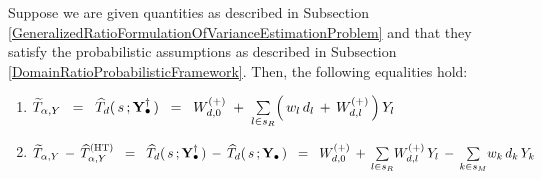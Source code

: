 \vskip 0.1cm
\begin{lemma}
\label{DomainRatioNumeratorImputationError}
\mbox{}
\vskip 0.1cm
\noindent
Suppose we are given quantities as described in Subsection
\ref{GeneralizedRatioFormulationOfVarianceEstimationProblem}
and
that they satisfy the probabilistic assumptions as described in Subsection
\ref{DomainRatioProbabilisticFramework}.
\vskip 0.1cm
\noindent
Then, the following equalities hold:
\renewcommand{\theenumi}{\roman{enumi}}
\renewcommand{\labelenumi}{\mbox{}\;\;\,(\theenumi)$\quad$}
\begin{enumerate}
\item
    $
    \widetilde{T}_{\alpha,Y}
    \;\; = \;\;
    \widehat{T}_{d}(\,s\,;\mathbf{Y}_{\bullet}^{\dagger}\,)
    \;\; = \;\;
        W^{(+)}_{d,0}
        \;+\;
        \underset{l \in s_{R}}{\sum}\!\left(\,w_{l}\,d_{l} \,+\, W^{(+)}_{d,l}\,\right)Y_{l}
    $
\item
    $
    \widetilde{T}_{\alpha,Y} \,-\, \widehat{T}^{\textnormal{(HT)}}_{\alpha,Y}
    \;\; = \;\;
    \widehat{T}_{d}(\,s\,;\mathbf{Y}_{\bullet}^{\dagger}\,)
    \,-\,
    \widehat{T}_{d}(\,s\,;\mathbf{Y}_{\bullet}\,)
    \;\; = \;\;
        W^{(+)}_{d,0}
        \,+\,
        \underset{l \in s_{R}}{\sum}W^{(+)}_{d,l}\,Y_{l}
        \,-\,
        \underset{k \in s_{M}}{\sum}w_{k}\,d_{k}\,Y_{k}
    $
\end{enumerate}
\end{lemma}

